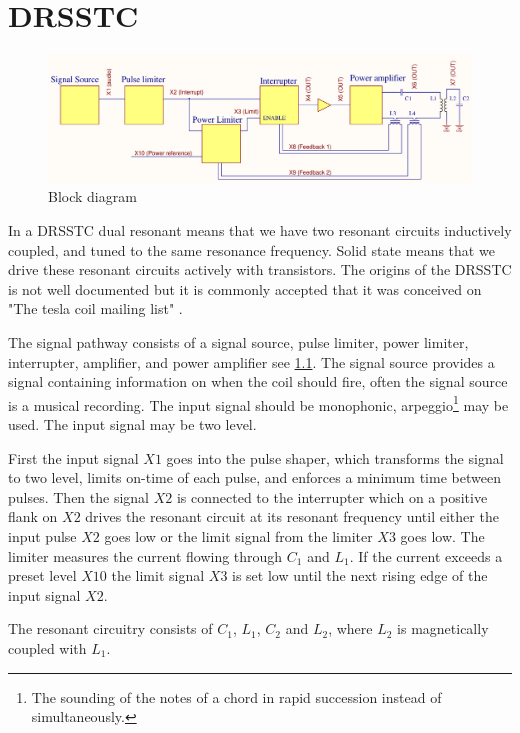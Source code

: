 \chapter{DRSSTC}
\label{DRSSTC}

\begin{figure}
    \centering
    \includegraphics[width=\textwidth]{Skjema/FunksjonsBlokkskjema.pdf}
    \caption{Block diagram}
    \label{fig:func_block}
\end{figure}

In a DRSSTC dual resonant means that we have two resonant circuits inductively coupled, and tuned to the same resonance frequency. Solid state means that we drive these resonant circuits actively with transistors. The origins of the DRSSTC is not well documented but it is commonly accepted that it was conceived on "The tesla coil mailing list" \citep{pupman}.

The signal pathway consists of a signal source, pulse limiter, power limiter, interrupter, amplifier, and power amplifier see \cref{fig:func_block}.
The signal source provides a signal containing information on when the coil should fire, often the signal source is a musical recording.
The input signal should be monophonic, arpeggio\footnote{The sounding of the notes of a chord in rapid succession instead of simultaneously.} may be used. The input signal may be two level.

First the input signal $X1$ goes into the pulse shaper, which transforms the signal to two level, limits on-time of each pulse, and enforces a minimum time between pulses. Then the signal $X2$ is connected to the interrupter which on a positive flank on $X2$ drives the resonant circuit at its resonant frequency until either the input pulse $X2$ goes low or the limit signal from the limiter $X3$ goes low.
The limiter measures the current flowing through $C_1$ and $L_1$. If the current exceeds a preset level $X10$ the limit signal $X3$ is set low until the next rising edge of the input signal $X2$.

The resonant circuitry consists of $C_1$, $L_1$, $C_2$ and $L_2$, where $L_2$ is magnetically coupled with $L_1$.


